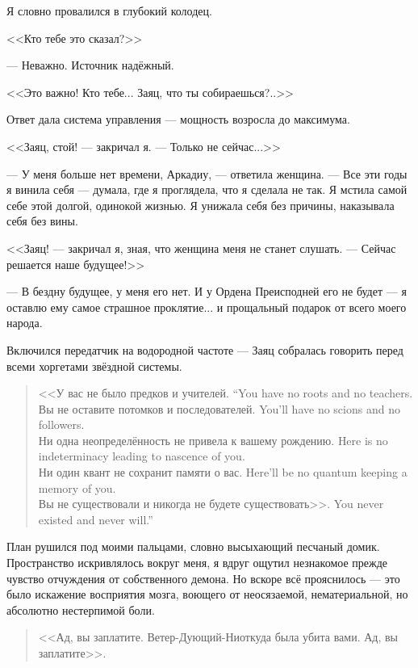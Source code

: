 Я словно провалился в глубокий колодец.

<<Кто тебе это сказал?>>

--- Неважно.
Источник надёжный.

<<Это важно!
Кто тебе...
Заяц, что ты собираешься?..>>

Ответ дала система управления --- мощность возросла до максимума.

<<Заяц, стой! --- закричал я.
--- Только не сейчас...>>

--- У меня больше нет времени, Аркадиу, --- ответила женщина.
--- Все эти годы я винила себя --- думала, где я проглядела, что я сделала не так.
Я мстила самой себе этой долгой, одинокой жизнью.
Я унижала себя без причины, наказывала себя без вины.

<<Заяц! --- закричал я, зная, что женщина меня не станет слушать.
--- Сейчас решается наше будущее!>>

---  В бездну будущее, у меня его нет.
И у Ордена Преисподней его не будет --- я оставлю ему самое страшное проклятие... и прощальный подарок от всего моего народа.

Включился передатчик на водородной частоте --- Заяц собралась говорить перед всеми хоргетами звёздной системы.

\begin{quote}
{<<У вас не было предков и учителей.}
{``You have no roots and no teachers.}\\
{Вы не оставите потомков и последователей.}
{You'll have no scions and no followers.}\\
{Ни одна неопределённость не привела к вашему рождению.}
{Here is no indeterminacy leading to nascence of you.}\\
{Ни один квант не сохранит памяти о вас.}
{Here'll be no quantum keeping a memory of you.}\\
{Вы не существовали и никогда не будете существовать>>.}
{You never existed and never will.''}
\end{quote}

План рушился под моими пальцами, словно высыхающий песчаный домик.
Пространство искривлялось вокруг меня, я вдруг ощутил незнакомое прежде чувство отчуждения от собственного демона.
Но вскоре всё прояснилось --- это было искажение восприятия мозга, воющего от неосязаемой, нематериальной, но абсолютно нестерпимой боли.

\begin{quote}
<<Ад, вы заплатите.
Ветер-Дующий-Ниоткуда была убита вами.
Ад, вы заплатите>>.
\end{quote}

